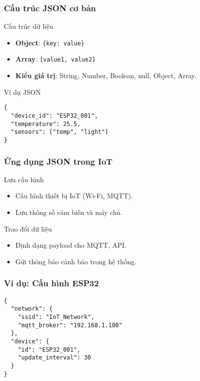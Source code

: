 \begin{frame}[fragile]
\frametitle{Cấu trúc JSON cơ bản}
\begin{block}{Cấu trúc dữ liệu}
\begin{itemize}
\item \textbf{Object}: \texttt{\{key: value\}}
\item \textbf{Array}: \texttt{[value1, value2]}
\item \textbf{Kiểu giá trị}: String, Number, Boolean, null, Object, Array.
\end{itemize}
\end{block}

\begin{exampleblock}{Ví dụ JSON}
\begin{verbatim}
{
  "device_id": "ESP32_001",
  "temperature": 25.5,
  "sensors": ["temp", "light"]
}
\end{verbatim}
\end{exampleblock}
\end{frame}

\begin{frame}
\frametitle{Ứng dụng JSON trong IoT}
\begin{block}{Lưu cấu hình}
\begin{itemize}
\item Cấu hình thiết bị IoT (Wi-Fi, MQTT).
\item Lưu thông số cảm biến và máy chủ.
\end{itemize}
\end{block}

\begin{block}{Trao đổi dữ liệu}
\begin{itemize}
\item Định dạng payload cho MQTT, API.
\item Gửi thông báo cảnh báo trong hệ thống.
\end{itemize}
\end{block}
\end{frame}

\begin{frame}[fragile]
\frametitle{Ví dụ: Cấu hình ESP32}
\begin{verbatim}
{
  "network": {
    "ssid": "IoT_Network",
    "mqtt_broker": "192.168.1.100"
  },
  "device": {
    "id": "ESP32_001",
    "update_interval": 30
  }
}
\end{verbatim}
\end{frame}

